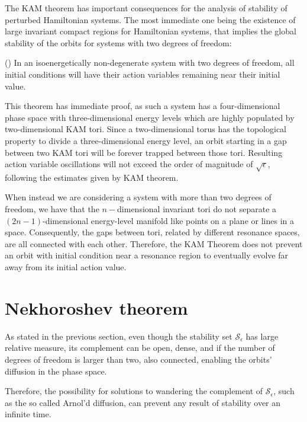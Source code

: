 The KAM theorem has important consequences for the analysis of stability of perturbed Hamiltonian systems. The most immediate one being the existence of large invariant compact regions for Hamiltonian systems, that implies the global stability of the orbits for systems with two degrees of freedom:
\begin{theorem}(\cite{KAM1})
    In an isoenergetically non-degenerate system with two degrees of freedom, all initial conditions will have their action variables remaining near their initial value.
\end{theorem} 
This theorem has immediate proof, as such a system has a four-dimensional phase space with three-dimensional energy levels which are highly populated by two-dimensional KAM tori. Since a two-dimensional torus has the topological property to divide a three-dimensional energy level, an orbit starting in a gap between two KAM tori will be forever trapped between those tori. Resulting action variable oscillations will not exceed the order of magnitude of $\sqrt{\epsilon}$, following the estimates given by KAM theorem. 

When instead we are considering a system with more than two degrees of freedom, we have that the $n-$dimensional invariant tori do not separate a $(2n-1)$-dimensional energy-level manifold like points on a plane or lines in a space. Consequently, the gaps between tori, related by different resonance spaces, are all connected with each other. Therefore, the KAM Theorem does not prevent an orbit with initial condition near a resonance region to eventually evolve far away from its initial action value. 

\section{Nekhoroshev theorem}\label{sec:1:nekhoroshev}

As stated in the previous section, even though the stability set $\mathcal{S}_\epsilon$ has large relative measure, its complement can be open, dense, and if the number of degrees of freedom is larger than two, also connected, enabling the orbits' diffusion in the phase space.

Therefore, the possibility for solutions to wandering the complement of $\mathcal{S}_\epsilon$, such as the so called Arnol’d diffusion, can prevent any result of stability over an infinite time.

